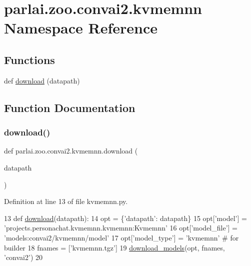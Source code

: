\hypertarget{namespaceparlai_1_1zoo_1_1convai2_1_1kvmemnn}{}\section{parlai.\+zoo.\+convai2.\+kvmemnn Namespace Reference}
\label{namespaceparlai_1_1zoo_1_1convai2_1_1kvmemnn}
\subsection*{Functions}
\begin{DoxyCompactItemize}
\item 
def \hyperlink{namespaceparlai_1_1zoo_1_1convai2_1_1kvmemnn_a984032582e81c6a3d609f8a72dfb616e}{download} (datapath)
\end{DoxyCompactItemize}


\subsection{Function Documentation}
\mbox{\label{namespaceparlai_1_1zoo_1_1convai2_1_1kvmemnn_a984032582e81c6a3d609f8a72dfb616e}} 
\subsubsection{\texorpdfstring{download()}{download()}}
{\footnotesize\ttfamily def parlai.\+zoo.\+convai2.\+kvmemnn.\+download (\begin{DoxyParamCaption}\item[{}]{datapath }\end{DoxyParamCaption})}



Definition at line 13 of file kvmemnn.\+py.


\begin{DoxyCode}
13 \textcolor{keyword}{def }\hyperlink{namespaceparlai_1_1zoo_1_1convai2_1_1kvmemnn_a984032582e81c6a3d609f8a72dfb616e}{download}(datapath):
14     opt = \{\textcolor{stringliteral}{'datapath'}: datapath\}
15     opt[\textcolor{stringliteral}{'model'}] = \textcolor{stringliteral}{'projects.personachat.kvmemnn.kvmemnn:Kvmemnn'}
16     opt[\textcolor{stringliteral}{'model\_file'}] = \textcolor{stringliteral}{'models:convai2/kvmemnn/model'}
17     opt[\textcolor{stringliteral}{'model\_type'}] = \textcolor{stringliteral}{'kvmemnn'}  \textcolor{comment}{# for builder}
18     fnames = [\textcolor{stringliteral}{'kvmemnn.tgz'}]
19     \hyperlink{namespaceparlai_1_1core_1_1build__data_ab697f23f05d3e36d7979fe5e0ed7911e}{download\_models}(opt, fnames, \textcolor{stringliteral}{'convai2'})
20 \end{DoxyCode}
